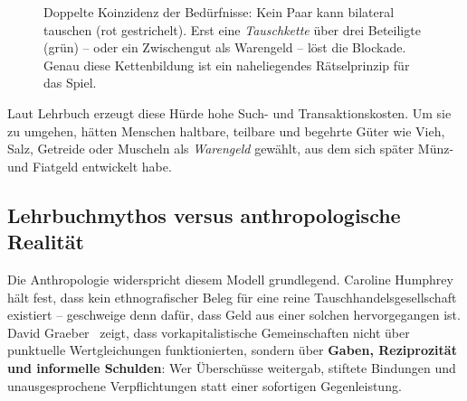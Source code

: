 \documentclass[11pt, a4paper]{article}
\begin{document}
\begin{figure}[H]
\centering
{}
\caption[Doppelte Koinzidenz der Bedürfnisse]{Doppelte Koinzidenz der
Bedürfnisse: Kein Paar kann bilateral tauschen (rot gestrichelt). Erst eine
\emph{Tauschkette} über drei Beteiligte (grün) -- oder ein Zwischengut als
Warengeld -- löst die Blockade. Genau diese Kettenbildung ist ein
naheliegendes Rätselprinzip für das Spiel.}
\label{fig:koinzidenz}
\end{figure}

Laut Lehrbuch erzeugt diese Hürde hohe Such- und Transaktionskosten. Um sie zu
umgehen, hätten Menschen haltbare, teilbare und begehrte Güter wie Vieh, Salz,
Getreide oder Muscheln als \emph{Warengeld} gewählt, aus dem sich später Münz-
und Fiatgeld entwickelt habe.

\subsection{Lehrbuchmythos versus anthropologische Realität}
\label{sec:mythos}

Die Anthropologie widerspricht diesem Modell grundlegend. Caroline
Humphrey~\cite{humphrey1985} hält fest, dass kein ethnografischer Beleg für
eine reine Tauschhandelsgesellschaft existiert -- geschweige denn dafür, dass
Geld aus einer solchen hervorgegangen ist. David Graeber~\cite{graeber2011}
zeigt, dass vorkapitalistische Gemeinschaften nicht über punktuelle
Wertgleichungen funktionierten, sondern über \textbf{Gaben, Reziprozität und
informelle Schulden}: Wer Überschüsse weitergab, stiftete Bindungen und
unausgesprochene Verpflichtungen statt einer sofortigen Gegenleistung.
\end{document}
